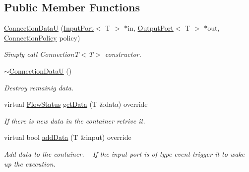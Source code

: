 \subsection*{Public Member Functions}
\begin{DoxyCompactItemize}
\item 
\hypertarget{classcoco_1_1_connection_data_u_aa5bf4219967a9deaa4d44aec278091d3}{}\hyperlink{classcoco_1_1_connection_data_u_aa5bf4219967a9deaa4d44aec278091d3}{Connection\+Data\+U} (\hyperlink{classcoco_1_1_input_port}{Input\+Port}$<$ T $>$ $\ast$in, \hyperlink{classcoco_1_1_output_port}{Output\+Port}$<$ T $>$ $\ast$out, \hyperlink{structcoco_1_1_connection_policy}{Connection\+Policy} policy)\label{classcoco_1_1_connection_data_u_aa5bf4219967a9deaa4d44aec278091d3}

\begin{DoxyCompactList}\small\item\em Simply call Connection\+T$<$\+T$>$ constructor. \end{DoxyCompactList}\item 
\hypertarget{classcoco_1_1_connection_data_u_a31f17d35886ce4eb08ea8856df15e09b}{}\hyperlink{classcoco_1_1_connection_data_u_a31f17d35886ce4eb08ea8856df15e09b}{$\sim$\+Connection\+Data\+U} ()\label{classcoco_1_1_connection_data_u_a31f17d35886ce4eb08ea8856df15e09b}

\begin{DoxyCompactList}\small\item\em Destroy remainig data. \end{DoxyCompactList}\item 
\hypertarget{classcoco_1_1_connection_data_u_aeef7e32d4fe7512b7ead3d3e069e0462}{}virtual \hyperlink{namespacecoco_a057be58377e415c9be98c1dc5c8426ad}{Flow\+Status} \hyperlink{classcoco_1_1_connection_data_u_aeef7e32d4fe7512b7ead3d3e069e0462}{get\+Data} (T \&data) override\label{classcoco_1_1_connection_data_u_aeef7e32d4fe7512b7ead3d3e069e0462}

\begin{DoxyCompactList}\small\item\em If there is new data in the container retrive it. \end{DoxyCompactList}\item 
\hypertarget{classcoco_1_1_connection_data_u_a886259fe50439a2dc9178cdf18178a42}{}virtual bool \hyperlink{classcoco_1_1_connection_data_u_a886259fe50439a2dc9178cdf18178a42}{add\+Data} (T \&input) override\label{classcoco_1_1_connection_data_u_a886259fe50439a2dc9178cdf18178a42}

\begin{DoxyCompactList}\small\item\em Add data to the container. ~\newline
 If the input port is of type event trigger it to wake up the execution. \end{DoxyCompactList}\end{DoxyCompactItemize}
